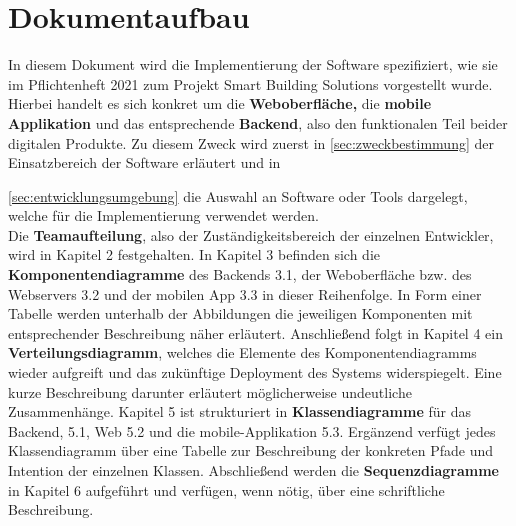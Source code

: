 \section{Dokumentaufbau}\label{sec:dokumentaufbau}
In diesem Dokument wird die Implementierung der Software spezifiziert,  wie sie im Pflichtenheft 2021 zum Projekt Smart Building Solutions vorgestellt wurde.  Hierbei handelt es sich konkret um die \textbf{Weboberfl\"ache,}  die \textbf{mobile Applikation} und das entsprechende \textbf{Backend},  also den funktionalen Teil beider digitalen Produkte.
Zu diesem Zweck wird zuerst in \ref{sec:zweckbestimmung} der Einsatzbereich der Software erl\"autert und in  {\ref{sec:entwicklungsumgebung} die Auswahl an Software oder Tools dargelegt,  welche f\"ur die Implementierung verwendet werden. \\
Die \textbf{Teamaufteilung},  also der Zust\"andigkeitsbereich der einzelnen Entwickler,  wird in Kapitel 2 festgehalten. 
In Kapitel 3 befinden sich die \textbf{Komponentendiagramme} des Backends 3.1,  der Weboberfl\"ache bzw.  des Webservers 3.2 und der mobilen App 3.3 in dieser Reihenfolge.  In Form einer Tabelle werden unterhalb der Abbildungen die jeweiligen Komponenten mit entsprechender Beschreibung n\"aher erl\"autert.
Anschlie{\ss}end folgt in Kapitel 4 ein \textbf{Verteilungsdiagramm},  welches die Elemente des Komponentendiagramms wieder aufgreift und das zuk\"unftige Deployment des Systems widerspiegelt.  Eine kurze Beschreibung darunter erl\"autert m\"oglicherweise undeutliche Zusammenh\"ange.
Kapitel 5 ist strukturiert in \textbf{Klassendiagramme} f\"ur das Backend,  5.1, Web 5.2 und die mobile-Applikation 5.3.
Erg\"anzend verf\"ugt jedes Klassendiagramm \"uber eine Tabelle zur Beschreibung der konkreten Pfade und Intention der einzelnen Klassen.
Abschlie{\ss}end werden die \textbf{Sequenzdiagramme} in Kapitel 6 aufgef\"uhrt und verf\"ugen, wenn n\"otig, \"uber eine schriftliche Beschreibung.

\newpage
}
